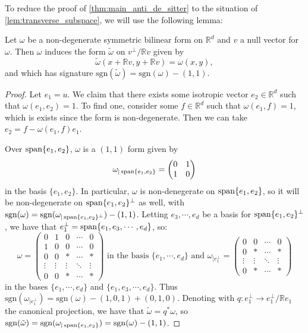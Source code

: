 \documentclass{report}
\begin{document}
To reduce the proof of \cref{thm:main_anti_de_sitter} to the situation of \cref{lem:transverse_subspace}, we will use the following lemma:
\begin{lemma}\label{lem:induced_form}
    Let $\omega$ be a non-degenerate symmetric bilinear form on $\mathbb R^d$ and $v$ a null vector for $\omega$.
    Then $\omega$ induces the form $\tilde{\omega}$ on $ v^\perp / \mathbb R v$ given by
    \[
    \tilde \omega(x + \mathbb Rv, y + \mathbb Rv) = \omega(x,y),
    \]
    and which has signature $\mathrm{sgn}( \tilde \omega) = \mathrm{sgn}(\omega) - (1,1)$.
\end{lemma}
\begin{proof}
    Let $e_1 = u$.
    We claim that there exists some isotropic vector $e_2 \in \mathbb R^d$ such that $\omega(e_1, e_2) = 1$.
    To find one, consider some $f \in \mathbb R^d$ such that $\omega(e_1, f) = 1$, which is exists since the form is non-degenerate.
    Then we can take $e_2 = f - \omega(e_1, f)e_1$. 

    Over $\operatorname{span}\{e_1, e_2\}$, $\omega$ is a $(1,1)$ form given by
    \[
    \omega_{|\operatorname{span}\{e_1, e_2\}} = \begin{pmatrix}
        0 & 1 \\
        1 & 0
    \end{pmatrix}
    \]
    in the basis $\{e_1, e_2\}$. 
    In particular, $\omega$ is non-denegerate on $\operatorname{span}\{ e_1, e_2 \}$, so it will be non-degenerate on $\operatorname{span}\{e_1, e_2\}^\perp$ as well, with $\mathrm{sgn}(\omega) = \mathrm{sgn}( \omega_{|\operatorname{span}\{e_1, e_2\}^\perp}) - (1,1)$.
    Letting $e_3, \cdots, e_d$ be a basis for $\operatorname{span}\{ e_1, e_2 \}^\perp$, we have that 
    $e_1^\perp = \operatorname{span}\{e_1, e_3, \cdots, e_d\}$, so:
    \[
    \omega = \begin{pmatrix}
        0 & 1 & 0 & \cdots & 0 \\
        1 & 0 & 0 & \cdots & 0 \\
        0 & 0 & * & \cdots & * \\
        \vdots & \vdots & \vdots & \ddots & \vdots \\
        0 & 0 & * & \cdots & *
    \end{pmatrix} \text{ in the basis } \{e_1, \cdots, e_d \} \text{ and }
    \omega_{|e_1^\perp} = \begin{pmatrix}
        0 & 0 & \cdots & 0 \\
        0 & * & \cdots & * \\
        \vdots & \vdots & \ddots & \vdots \\
        0 & * & \cdots & *
    \end{pmatrix}
    \]
    in the bases  $\{e_1, \cdots, e_d \}$ and  $\{e_1, e_3, \cdots, e_d \}$.
    Thus $\mathrm{sgn}(\omega_{|e_1^\perp}) = \mathrm{sgn}(\omega) - (1,0,1) + (0,1,0)$. 
    Denoting with $q: e_1^\perp \to e_1^\perp/\mathbb R e_1$ the canonical projection, we have that $\tilde \omega = q^* \omega$, so $\mathrm{sgn}(\tilde \omega) = \mathrm{sgn}(\omega_{|\operatorname{span}\{e_1, e_2\}}) = \mathrm{sgn}(\omega) - (1,1)$.
\end{proof}
\end{document}
